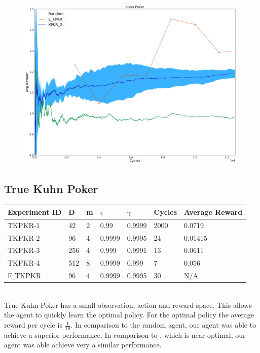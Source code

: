 \documentclass{article}
\theoremstyle{definition}
\newtheorem{primary statistics}[definition]{Primary Statistics}
\newtheorem{auxiliary statistics}[definition]{Auxiliary Statistics}
\begin{document}
 \begin{figure}[!htb]
 \centering
    \includegraphics[width=11.1cm]{Kuhn_Poker}
\end{figure}



\newpage

\subsection{True Kuhn Poker}
\begin{tabular}{|l|l|l|l|l|l|l|}
\hline \centering
 Experiment ID& D & m & $\epsilon$ & $\gamma$ & Cycles & Average Reward \\ \hline
TKPKR-1  & 42        & 2           & 0.99        & 0.9999            & 2000   & 0.0719        \\ \hline
TKPKR-2  & 96        & 4           & 0.9999      & 0.9995            & 24     & 0.01415         \\ \hline
TKPKR-3  & 256       & 4           & 0.999       & 0.9991            & 13     & 0.0611         \\ \hline
TKPKR-4  & 512       & 8           & 0.9999      & 0.999             & 7      & 0.056      \\ \hline 
E\underline{ }TKPKR  & 96       & 4           & 0.9999      & 0.9995             & 30      & N/A      \\ \hline        
\end{tabular} \\

True Kuhn Poker has a small observation, action and reward space. This allows the agent to quickly learn the optimal policy. For the optimal policy the average reward per cycle is $\frac{1}{18}$. In comparison to the random agent, our agent was able to achieve a superior performance. In comparison to \cite{veness2011monte}, which is near optimal, our agent was able achieve very a similar performance.
\end{document}
